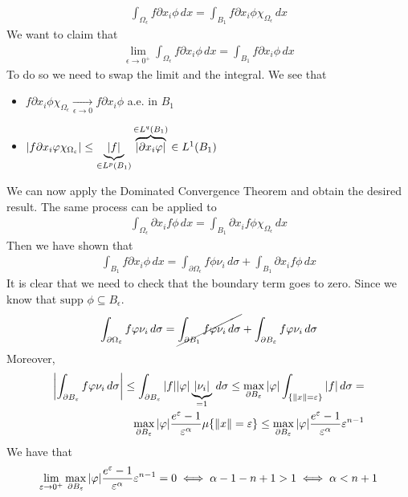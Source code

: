 \[
    \begin{split}
        \int_{\Omega_\epsilon} f \partial x_i \phi \, dx = \int_{B_1} f \partial x_i \phi \chi_{\Omega_\epsilon} \, dx
    \end{split}
\]
We want to claim that 
\[
    \begin{split}
        \lim_{\epsilon \to 0^+} \int_{\Omega_\epsilon} f \partial x_i \phi \, dx = \int_{B_1} f \partial x_i \phi \, dx
    \end{split}
\]
To do so we need to swap the limit and the integral. We see that 
\begin{itemize}
    \item \(f \partial x_i \phi \chi_{\Omega_\epsilon} \underset{\epsilon \to 0}{\longrightarrow} f \partial x_i \phi\) a.e. in \(B_1\)
    \item \(\abs{f \partial x_i \phi \chi_{\Omega_\epsilon}} \leq \underbrace{\abs{f}}_{\in L^p(B_1)} \overbrace{\abs{\partial x_i \phi}}^{\in L^q(B_1)} \in L^1(B_1)\)
\end{itemize}
We can now apply the Dominated Convergence Theorem and obtain the desired result. 
The same process can be applied to
\[
    \begin{split}
        \int_{\Omega_\epsilon} \partial x_i f \phi \, dx = \int_{B_1} \partial x_i f \phi \chi_{\Omega_\epsilon} \, dx
    \end{split}
\]
Then we have shown that 
\[
    \begin{split}
        \int_{B_1} f \partial x_i \phi \, dx = \int_{\partial\Omega_\epsilon} f \phi \nu_i \, d\sigma + \int_{B_1} \partial x_i f \phi \, dx
    \end{split}
\]
It is clear that we need to check that the boundary term goes to zero. Since we know that \(\text{supp } \phi \subseteq B_\epsilon\).
\[
    \begin{split}
        \int_{\partial\Omega_\epsilon} f \phi \nu_i \, d\sigma = \cancel{\int_{\partial B_1} f \phi \nu_i \, d\sigma} + \int_{\partial B_\epsilon} f \phi \nu_i \, d\sigma
    \end{split}
\]
Moreover,
\[
    \begin{split}
        \abs{\int_{\partial B_\epsilon} f \phi \nu_i \, d\sigma} \leq \int_{\partial B_\epsilon} \abs{f} \abs{\phi} \underbrace{\abs{\nu_i}}_{=1} \, d\sigma \leq \max_{\partial B_\epsilon} \abs{\phi} \int_{\{ \norm{x} = \epsilon \}} \abs{f} \, d\sigma = \\
        \max_{\partial B_\epsilon} \abs{\phi} \frac{e^{\epsilon} - 1}{\epsilon^\alpha} \mu\{\norm{x} = \epsilon\} \leq \max_{\partial B_\epsilon} \abs{\phi} \frac{e^{\epsilon} - 1}{\epsilon^\alpha} \epsilon^{n-1} 
    \end{split}
\]
We have that 
\[
    \begin{split}
        \lim_{\epsilon \to 0^+} \max_{\partial B_\epsilon} \abs{\phi} \frac{e^{\epsilon} - 1}{\epsilon^\alpha} \epsilon^{n-1} = 0 \iff \alpha - 1 - n + 1 > 1 \iff \alpha < n + 1
    \end{split}
\]

